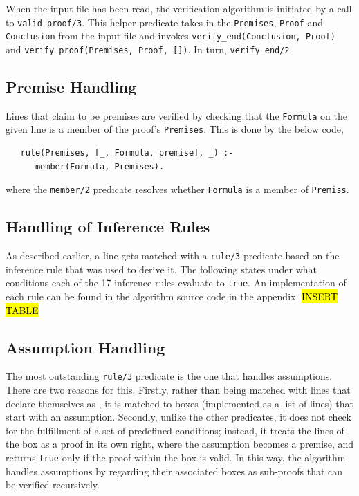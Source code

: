 \documentclass[a4paper, 11pt]{article}
\begin{document}
   When the input file has been read, the verification
   algorithm is initiated by a call to
   \texttt{valid\_proof/3}. This helper predicate takes in the
   \texttt{Premises}, \texttt{Proof} and \texttt{Conclusion}
   from the input file and invokes 
   \texttt{verify\_end(Conclusion, Proof)} and
   \texttt{verify\_proof(Premises, Proof, [])}. In turn,
   \texttt{verify\_end/2} 

   \subsection{Premise Handling}
   \label{premise-handling}
   Lines that claim to be premises are verified by checking
   that the \texttt{Formula} on the given line is a member of 
   the proof's \texttt{Premises}. This is done by the below
   code, 
   
\begin{verbatim}
   rule(Premises, [_, Formula, premise], _) :-
      member(Formula, Premises).
\end{verbatim}

   where the \texttt{member/2} predicate resolves
   whether \texttt{Formula} is a member of \texttt{Premiss}. 
   
   \subsection{Handling of Inference Rules}
   \label{handling-of-inference-rules}

   As described earlier, a line gets matched with a 
   \texttt{rule/3} predicate based on the inference rule that 
   was used to derive it. The following states under what
   conditions each of the 17 inference rules evaluate to
   \texttt{true}. An implementation of each rule can be found
   in the algorithm source code in the appendix.
   \bigbreak
   \hl{INSERT TABLE}

   \subsection{Assumption Handling}
   \label{assumption-handling}
   The most outstanding \texttt{rule/3} predicate is the one
   that handles assumptions. There are two reasons for this.
   Firstly, rather than being matched with lines that declare
   themselves as , it is matched to
   boxes (implemented as a list of lines) that start with an 
   assumption. Secondly, unlike the other predicates, it does
   not check for the fulfillment of a set of predefined
   conditions; instead, it treats the lines of the box as a
   proof in its own right, where the assumption becomes a
   premise, and returns \texttt{true} only if the proof within
   the box is valid. In this way, the algorithm handles
   assumptions by regarding their associated boxes as 
   sub-proofs that can be verified recursively.
   \bigbreak
\end{document}
